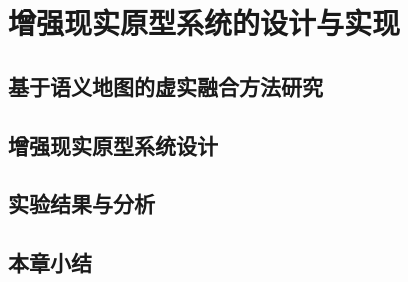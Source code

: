 \chapter{增强现实原型系统的设计与实现}\label{chap:5}
\section{基于语义地图的虚实融合方法研究}
\section{增强现实原型系统设计}
\section{实验结果与分析}
\section{本章小结}
